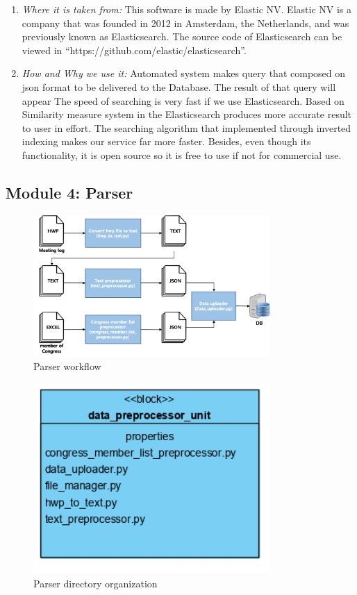 \documentclass[conference]{IEEEtran}
\begin{document}
\begin{enumerate}
\begin{enumerate}
\end{enumerate}

 
   \item \textit{Where it is taken from: } This software is made by Elastic NV. Elastic NV is a company that was founded in 2012 in Amsterdam, the Netherlands, and was previously known as Elasticsearch. The source code of Elasticsearch can be viewed in “https://github.com/elastic/elasticsearch”.\\
   
  \item \textit{How and Why we use it: } Automated system makes query that composed on json format to be delivered to the Database. The result of that query will appear The speed of searching is very fast if we use Elasticsearch. Based on Similarity measure system in the Elasticsearch produces more accurate result to user in effort.  The searching algorithm that implemented through inverted indexing makes our service far more faster. Besides, even though its functionality, it is open source so it is free to use if not for commercial use.\\
  \end{enumerate}
 
 
 
 
 
 
    \subsection{Module 4: Parser}
\begin{figure}[htbp]
\centerline{\includegraphics[width=90mm,scale=0.5]{fig/6_9.png}}
\caption{Parser workflow}
\label{fig}
\end{figure}

\begin{figure}[htbp]
\centerline{\includegraphics[width=90mm,scale=0.5]{fig/6_10.png}}
\caption{Parser directory organization}
\label{fig}
\end{figure}
\end{document}
